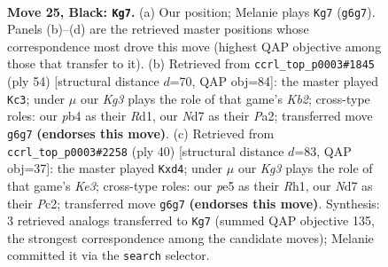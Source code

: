 \documentclass[11pt]{article}
\begin{document}
\clearpage

\begin{figure}[p]\centering
\begin{subfigure}{0.46\textwidth}\centering
\resizebox{\linewidth}{!}{%
\newchessgame
\chessboard[
  setfen={r1r5/1ppnNp1P/p5k1/P3P1p1/1PNbP1b1/8/8/R3KB1R b KQ - 2 25},
  showmover=false,
  pgfstyle=straightmove, color=movearrow, markmove={g6-g7}
]}
\caption{}
\end{subfigure}\hfill
\begin{subfigure}{0.46\textwidth}\centering
\resizebox{\linewidth}{!}{%
\newchessgame
\chessboard[
  setfen={r1b1r1k1/5ppp/2p5/2NpB1P1/p1nP3P/5P2/PKP5/3R3R w - - 2 28},
  showmover=false,
  pgfstyle=straightmove, color=movearrow, markmove={b2-c3}
]}
\caption{}
\end{subfigure}
\\[4pt]
\begin{subfigure}{0.46\textwidth}\centering
\resizebox{\linewidth}{!}{%
\newchessgame
\chessboard[
  setfen={6rr/pp2kp2/2b1p1p1/2n1P3/3p1P2/3BKN2/PPP3P1/R6R w - - 0 21},
  showmover=false,
  pgfstyle=straightmove, color=movearrow, markmove={e3-d4}
]}
\caption{}
\end{subfigure}\hfill

\caption{\textbf{Move 25, Black: \texttt{Kg7}.} (a) Our position; Melanie plays \texttt{Kg7} (\texttt{g6g7}). Panels (b)--(d) are the retrieved master positions whose correspondence most drove this move (highest QAP objective among those that transfer to it). (b) Retrieved from \texttt{ccrl\_top\_p0003\#1845} (ply 54) [structural distance $d$=70, QAP obj=84]: the master played \texttt{Kc3}; under $\mu$ our \emph{Kg3} plays the role of that game's \emph{Kb2}; cross-type roles: our \emph{p}b4 as their \emph{R}d1, our \emph{N}d7 as their \emph{P}a2; transferred move \texttt{g6g7} \textbf{(endorses this move)}. (c) Retrieved from \texttt{ccrl\_top\_p0003\#2258} (ply 40) [structural distance $d$=83, QAP obj=37]: the master played \texttt{Kxd4}; under $\mu$ our \emph{Kg3} plays the role of that game's \emph{Ke3}; cross-type roles: our \emph{p}e5 as their \emph{R}h1, our \emph{N}d7 as their \emph{P}c2; transferred move \texttt{g6g7} \textbf{(endorses this move)}. Synthesis: 3 retrieved analogs transferred to \texttt{Kg7} (summed QAP objective 135, the strongest correspondence among the candidate moves); Melanie committed it via the \texttt{search} selector.}
\label{fig:thought-m49}
\end{figure}

\clearpage
\end{document}
